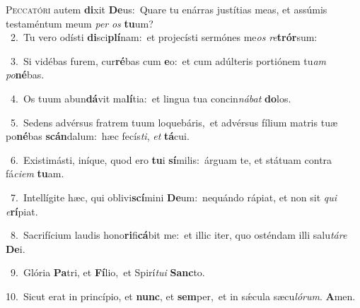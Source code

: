 \lettrine{\initial\textcolor{\initialcolor}{P}}{eccatóri} autem \textbf{di}\-xit \textbf{De}\-us:~\star Quare tu enárras justítias meas, et assúmis testaméntum meum \textit{per} \textit{os} \textbf{tu}\-um?\\
{\numbfont\textcolor{\numbcolor}{~2.}}~Tu vero odísti \textbf{di}\-sci\-\textbf{plí}\-nam:~\star et projecísti sermónes me\textit{os} \textit{re}\-\textbf{trór}sum:\par
{\numbfont\textcolor{\numbcolor}{~3.}}~Si vidébas furem, cur\-\textbf{ré}\-bas cum \textbf{e}\-o:~\star et cum adúlteris portiónem tu\textit{am} \textit{po}\-\textbf{né}bas.\par
{\numbfont\textcolor{\numbcolor}{~4.}}~Os tuum abun\-\textbf{dá}\-vit ma\-\textbf{lí}\-tia:~\star et lingua tua concin\-\textit{ná}\-\textit{bat} \textbf{do}\-los.\par
{\numbfont\textcolor{\numbcolor}{~5.}}~Sedens advérsus fratrem tuum loquebáris,~\dagger et advérsus fílium matris tuæ po\-\textbf{né}\-bas \textbf{scán}\-dalum:~\star hæc fecís\-\textit{ti}\-, \textit{et} \textbf{tá}\-cui.\par
{\numbfont\textcolor{\numbcolor}{~6.}}~Existimásti, iníque, quod ero \textbf{tu}\-i \textbf{sí}\-milis:~\star árguam te, et státuam contra fá\-\textit{ci}\-\textit{em} \textbf{tu}\-am.\par
{\numbfont\textcolor{\numbcolor}{~7.}}~Intellígite hæc, qui oblivi\-\textbf{scí}\-mini \textbf{De}\-um:~\star nequándo rápiat, et non sit \textit{qui} \textit{e}\-\textbf{rí}piat.\par
{\numbfont\textcolor{\numbcolor}{~8.}}~Sacrifícium laudis hono\-\textbf{ri}\-fi\-\textbf{cá}\-bit me:~\star et illic iter, quo osténdam illi salu\-\textit{tá}\-\textit{re} \textbf{De}\-i.\par
{\numbfont\textcolor{\numbcolor}{~9.}}~Glória \textbf{Pa}\-tri, et \textbf{Fí}\-lio,~\star et Spirí\-\textit{tu}\-\textit{i} \textbf{Sanc}\-to.\par
{\numbfont\textcolor{\numbcolor}{10.}}~Sicut erat in princípio, et \textbf{nunc}\-, et \textbf{sem}\-per,~\star et in sǽcula sæcu\-\textit{ló}\-\textit{rum}. \textbf{A}\-men.\par

